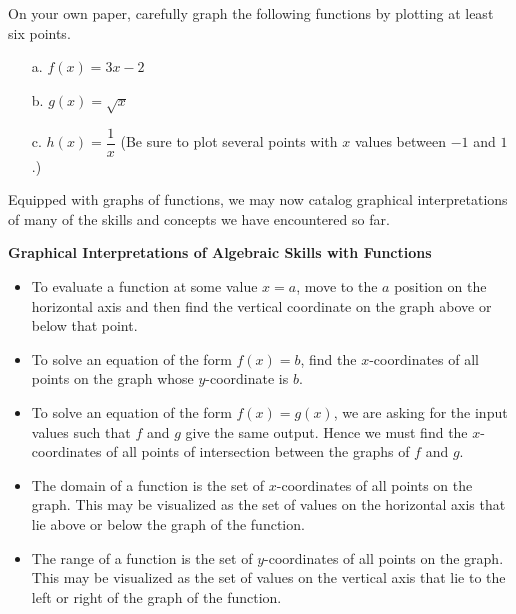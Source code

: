 \begin{question} On your own paper, carefully graph the following functions by plotting at least six points.
\begin{enumerate}
\item[a.] $f(x) = 3x-2$
\item[b.] $g(x) = \sqrt{x}$
\item[c.] $h(x) = \dfrac{1}{x}$ (Be sure to plot several points with $x$ values between $-1$ and $1$.)
\end{enumerate} 
\end{question}

Equipped with graphs of functions, we may now catalog graphical interpretations of many of the skills and concepts we have encountered so far.

\begin{tcolorbox}
{\bf Graphical Interpretations of Algebraic Skills with Functions}
\begin{itemize}
\item To evaluate a function at some value $x=a$, move to the $a$ position on the horizontal axis and then find the vertical coordinate on the graph above or below that point.
\item To solve an equation of the form $f(x) = b$, find the $x$-coordinates of all points on the graph whose $y$-coordinate is $b$.
\item To solve an equation of the form $f(x) = g(x)$, we are asking for the input values such that $f$ and $g$ give the same output. Hence we must find the $x$-coordinates of all points of intersection between the graphs of $f$ and $g$. 
\item The domain of a function is the set of $x$-coordinates of all points on the graph. This may be visualized as the set of values on the horizontal axis that lie above or below the graph of the function.
\item The range of a function is the set of $y$-coordinates of all points on the graph. This may be visualized as the set of values on the vertical axis that lie to the left or right of the graph of the function.
\end{itemize}
\end{tcolorbox}

\pagebreak

